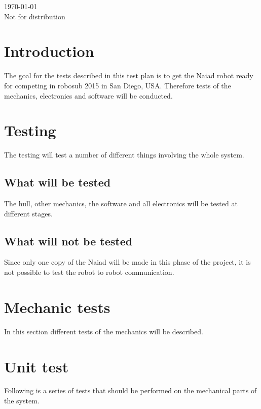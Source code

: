 \documentclass[10pt,a4paper]{article}
\begin{document}
\begin{titlepage}
{\large \today}\\[0.5cm]
Not for distribution %


 

\vfill %

\end{titlepage}
\section{Introduction}
The goal for the tests described in this test plan is to get the Naiad robot ready for competing in robosub 2015 in San Diego, USA. Therefore tests of the mechanics, electronics and software will be conducted. 
\section{Testing}
The testing will test a number of different things involving the whole system. 
\subsection{What will be tested}
The hull, other mechanics, the software and all electronics will be tested at different stages. 
\subsection{What will not be tested}
Since only one copy of the Naiad will be made in this phase of the project, it is not possible to test the robot to robot communication.


\section*{Mechanic tests}
In this section different tests of the mechanics will be described.
\section{Unit test}
Following is a series of tests that should be performed on the mechanical parts of the system. 
\end{document}

